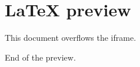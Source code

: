 \documentclass{article}
\begin{document}
\section{LaTeX preview}
This document overflows the iframe.
\vspace{800pt}

End of the preview.
\end{document}
